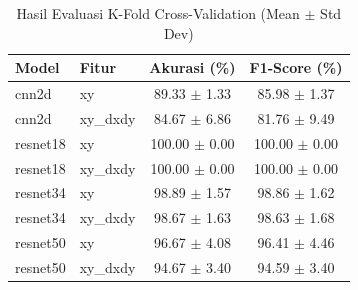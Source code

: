 \begin{table}[H]
  \centering
  \caption{Hasil Evaluasi K-Fold Cross-Validation (Mean $\pm$ Std Dev)}
  \label{tab:kfold-detailed}
  \begin{tabular}{|l|l|c|c|}
  \hline
  \textbf{Model} & \textbf{Fitur} & \textbf{Akurasi (\%)} & \textbf{F1-Score (\%)} \\ \hline
cnn2d & xy & 89.33 $\pm$ 1.33 & 85.98 $\pm$ 1.37 \\ \hline
cnn2d & xy_dxdy & 84.67 $\pm$ 6.86 & 81.76 $\pm$ 9.49 \\ \hline
resnet18 & xy & 100.00 $\pm$ 0.00 & 100.00 $\pm$ 0.00 \\ \hline
resnet18 & xy_dxdy & 100.00 $\pm$ 0.00 & 100.00 $\pm$ 0.00 \\ \hline
resnet34 & xy & 98.89 $\pm$ 1.57 & 98.86 $\pm$ 1.62 \\ \hline
resnet34 & xy_dxdy & 98.67 $\pm$ 1.63 & 98.63 $\pm$ 1.68 \\ \hline
resnet50 & xy & 96.67 $\pm$ 4.08 & 96.41 $\pm$ 4.46 \\ \hline
resnet50 & xy_dxdy & 94.67 $\pm$ 3.40 & 94.59 $\pm$ 3.40 \\ \hline
  \end{tabular}
\end{table}